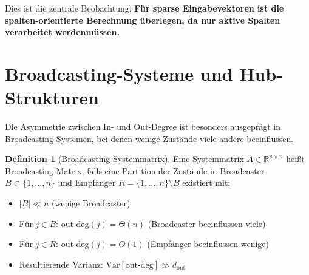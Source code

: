 \documentclass[a4paper,12pt]{report}
\theoremstyle{definition}
\newtheorem{definition}{Definition}
\begin{document}
	Dies ist die zentrale Beobachtung: \textbf{Für sparse Eingabevektoren ist die spalten-orientierte Berechnung überlegen, da nur aktive Spalten verarbeitet werden\linebreak[2] müssen.}
	
	\section{Broadcasting-Systeme und Hub-Strukturen}
	
	Die Asymmetrie zwischen In- und Out-Degree ist besonders ausgeprägt in Broadcasting-Systemen, bei denen wenige Zustände viele andere beeinflussen.
	
	\begin{definition}[Broadcasting-Systemmatrix]
		Eine Systemmatrix $A \in \mathbb{R}^{n \times n}$ heißt Broadcas\-ting-Matrix, falls eine Partition der Zustände in Broadcaster $B \subset \{1,\ldots,n\}$ und Empfänger $R = \{1,\ldots,n\} \setminus B$ existiert mit:
		\begin{itemize}
			\item $|B| \ll n$ (wenige Broadcaster)
			\item Für $j \in B$: $\text{out-deg}(j) = \Theta(n)$ (Broadcaster beeinflussen viele)
			\item Für $j \in R$: $\text{out-deg}(j) = O(1)$ (Empfänger beeinflussen wenige)
			\item Resultierende Varianz: $\text{Var}[\text{out-deg}] \gg \bar{d}_{\text{out}}$
		\end{itemize}
	\end{definition}
	
\end{document}
